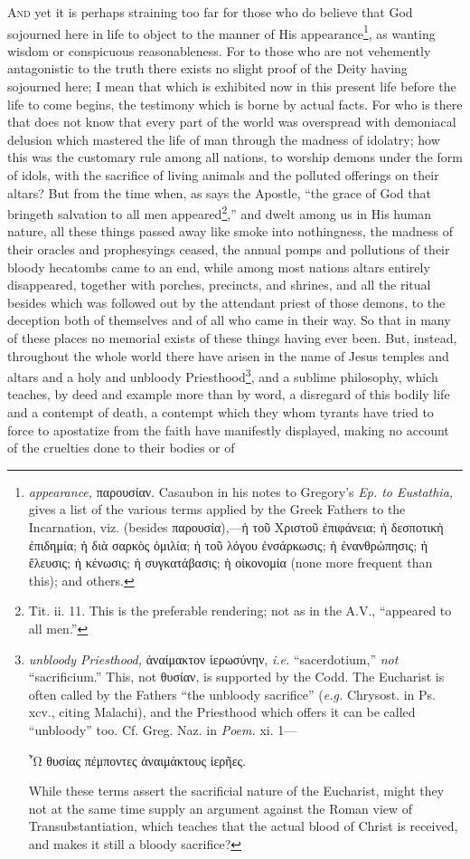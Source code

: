 \textsc{And} yet it is perhaps straining too far for those who do believe that God sojourned here in life to object to the manner of His appearance\footnote{\emph{appearance,} \textgreek{παρουσίαν}. Casaubon in his notes to Gregory’s \emph{Ep. to Eustathia,} gives a list of the various terms applied by the Greek Fathers to the Incarnation, viz. (besides \textgreek{παρουσία}),—\textgreek{ἡ τοῦ Χριστοῦ ἐπιφάνεια; ἡ δεσποτικὴ ἐπιδημία; ἡ διὰ σαρκὸς ὁμιλία; ἡ τοῦ λόγου ἐνσάρκωσις; ἡ ἐνανθρώπησις; ἡ ἔλευσις; ἡ κένωσις; ἡ συγκατάβασις; ἡ οἰκονομία} (none more frequent than this); and others.}, as wanting wisdom or conspicuous reasonableness. For to those who are not vehemently antagonistic to the truth there exists no slight proof of the Deity having sojourned here; I mean that which is exhibited now in this present life before the life to come begins, the testimony which is borne by actual facts. For who is there that does not know that every part of the world was overspread with demoniacal delusion which mastered the life of man through the madness of idolatry; how this was the customary rule among all nations, to worship demons under the form of idols, with the sacrifice of living animals and the polluted offerings on their altars? But from the time when, as says the Apostle, “the grace of God that bringeth salvation to all men appeared\footnote{Tit. ii. 11. This is the preferable rendering; not as in the A.V., “appeared to all men.”},” and dwelt among us in His human nature, all these things passed away like smoke into nothingness, the madness of their oracles and prophesyings ceased, the annual pomps and pollutions of their bloody hecatombs came to an end, while among most nations altars entirely disappeared, together with porches, precincts, and shrines, and all the ritual besides which was followed out by the attendant priest of those demons, to the deception both of themselves and of all who came in their way. So that in many of these places no memorial exists of these things having ever been. But, instead, throughout the whole world there have arisen in the name of Jesus temples and altars and a holy and unbloody Priesthood\footnote{\emph{unbloody Priesthood,} \textgreek{ἀναίμακτον ἱερωσύνην}, \emph{i.e.} “sacerdotium,” \emph{not} “sacrificium.” This, not \textgreek{θυσίαν}, is supported by the Codd. The Eucharist is often called by the Fathers “the unbloody sacrifice” (\emph{e.g.} Chrysost. in Ps. xcv., citing Malachi), and the Priesthood which offers it can be called “unbloody” too. Cf. Greg. Naz. in \emph{Poem.} xi. 1— \par \textgreek{῏Ω θυσίας πέμποντες ἀναιμάκτους ἱερῆες}. \par While these terms assert the sacrificial nature of the Eucharist, might they not at the same time supply an argument against the Roman view of Transubstantiation, which teaches that the actual blood of Christ is received, and makes it still a bloody sacrifice?}, and a sublime philosophy, which teaches, by deed and example more than by word, a disregard of this bodily life and a contempt of death, a contempt which they whom tyrants have tried to force to apostatize from the faith have manifestly displayed, making no account of the cruelties done to their bodies or of 